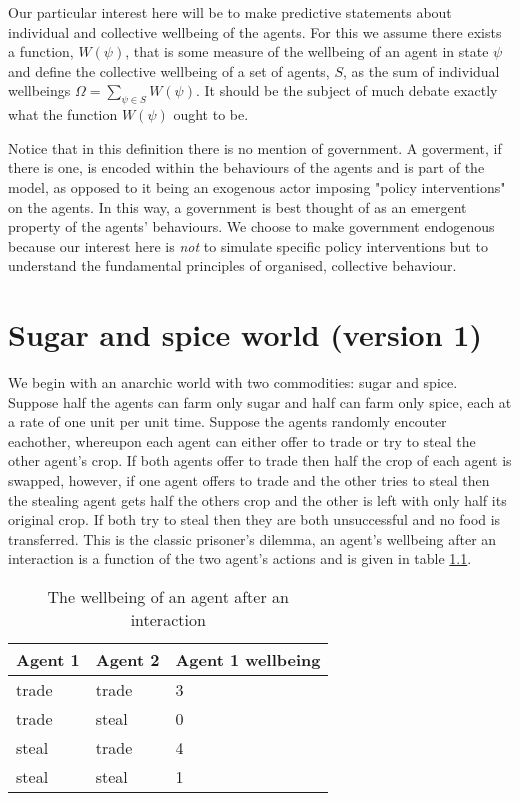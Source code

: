 \documentclass[a4paper]{report}
\begin{document}
Our particular interest here will be to make predictive statements about individual and collective wellbeing of the agents. For this we assume there exists a function, $W(\psi)$, that is some measure of the wellbeing of an agent in state $\psi$ and define the collective wellbeing of a set of agents, $S$, as the sum of individual wellbeings $\Omega = \sum_{\psi \in S} W(\psi)$. It should be the subject of much debate exactly what the function $W(\psi)$ ought to be.

Notice that in this definition there is no mention of government. A goverment, if there is one, is encoded within the behaviours of the agents and is part of the model, as opposed to it being an exogenous actor imposing "policy interventions" on the agents. In this way, a government is best thought of as an emergent property of the agents' behaviours. We choose to make government endogenous because our interest here is \textit{not} to simulate specific policy interventions but to understand the fundamental principles of organised, collective behaviour.

\chapter{Sugar and spice world (version 1)}

We begin with an anarchic world with two commodities: sugar and spice. Suppose half the agents can farm only sugar and half can farm only spice, each at a rate of one unit per unit time. Suppose the agents randomly encouter eachother, whereupon each agent can either offer to trade or try to steal the other agent's crop. If both agents offer to trade then half the crop of each agent is swapped, however, if one agent offers to trade and the other tries to steal then the stealing agent gets half the others crop and the other is left with only half its original crop. If both try to steal then they are both unsuccessful and no food is transferred. This is the classic prisoner's dilemma, an agent's wellbeing after an interaction is a function of the two agent's actions and is given in table \ref{prisonersdilemmareward}.

\begin{table}
\begin{center}
\begin{tabular}{lll}
Agent 1  & Agent 2 & Agent 1 wellbeing \\
\hline
trade & trade & 3 \\
trade & steal  & 0 \\
steal & trade & 4 \\
steal & steal & 1 \\
\hline
\end{tabular}
\end{center}
\caption{The wellbeing of an agent after an interaction}
\label{prisonersdilemmareward}
\end{table}
\end{document}
